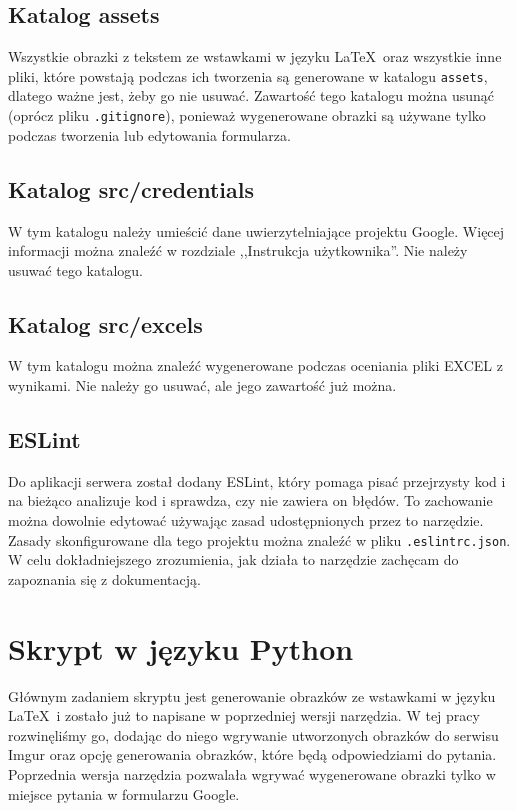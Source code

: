  
\subsection{Katalog assets}
Wszystkie obrazki z tekstem ze wstawkami w języku \LaTeX\ oraz wszystkie inne pliki, które
powstają podczas ich tworzenia są generowane w katalogu \texttt{assets}, dlatego ważne jest, żeby
go nie usuwać. Zawartość tego katalogu można usunąć (oprócz pliku \texttt{.gitignore}), ponieważ
wygenerowane obrazki są używane tylko podczas tworzenia lub edytowania formularza.

\subsection{Katalog src/credentials}
W tym katalogu należy umieścić dane uwierzytelniające projektu Google. Więcej informacji można
znaleźć w rozdziale ,,Instrukcja użytkownika''. Nie należy usuwać tego katalogu.

\subsection{Katalog src/excels}
W tym katalogu można znaleźć wygenerowane podczas oceniania pliki EXCEL z wynikami. Nie należy go
usuwać, ale jego zawartość już można.

\subsection{ESLint}
Do aplikacji serwera został dodany ESLint, który pomaga pisać przejrzysty kod i na bieżąco
analizuje kod i sprawdza, czy nie zawiera on błędów. To zachowanie można dowolnie edytować używając 
zasad udostępnionych przez to narzędzie. Zasady skonfigurowane dla tego projektu można znaleźć 
w pliku \texttt{.eslintrc.json}. W celu dokładniejszego zrozumienia, jak działa to narzędzie 
zachęcam do zapoznania się z dokumentacją.

\section{Skrypt w języku Python}

Głównym zadaniem skryptu jest generowanie obrazków ze wstawkami w języku \LaTeX \ i zostało
już to napisane w poprzedniej wersji narzędzia. W tej pracy rozwinęliśmy go, dodając do
niego wgrywanie utworzonych obrazków do serwisu Imgur oraz opcję generowania
obrazków, które będą odpowiedziami do pytania. Poprzednia wersja narzędzia pozwalała
wgrywać wygenerowane obrazki tylko w miejsce pytania w formularzu Google.

